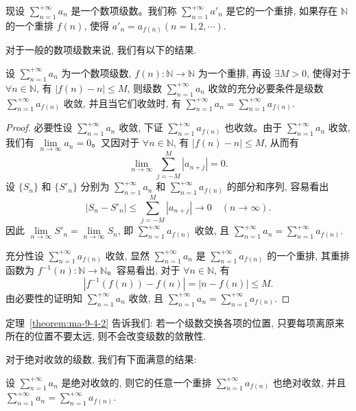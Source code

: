 现设 $\sum\limits_{n=1}^{+\infty}a_n$ 是一个数项级数。我们称 $\sum\limits_{n=1}^{+\infty}a'_n$ 是它的一个重排, 如果存在 $\mathbb{N}$ 的一个重排 $f(n)$, 使得 $a'_n=a_{f(n)}(n=1,2,\cdots)$.

对于一般的数项级数来说, 我们有以下的结果.

\begin{theorem}\label{theorem:ma-9-4-2}
设 $\sum\limits_{n=1}^{+\infty}a_n$ 为一个数项级数, $f(n):\mathbb{N}\to\mathbb{N}$ 为一个重排, 再设 $\exists M>0$, 使得对于 $\forall n\in\mathbb{N}$, 有 $|f(n)-n|\leq M$, 则级数 $\sum\limits_{n=1}^{+\infty}a_n$ 收敛的充分必要条件是级数 $\sum\limits_{n=1}^{+\infty}a_{f(n)}$ 收敛, 并且当它们收敛时, 有 $\sum\limits_{n=1}^{+\infty}a_n=\sum\limits_{n=1}^{+\infty}a_{f(n)}$.
\end{theorem}


\begin{proof}
必要性\quad 设 $\sum\limits_{n=1}^{+\infty}a_n$ 收敛, 下证 $\sum\limits_{n=1}^{+\infty}a_{f(n)}$ 也收敛。由于 $\sum\limits_{n=1}^{+\infty}a_n$ 收敛, 我们有 $\lim\limits_{n\to\infty}a_n=0$。又因对于 $\forall n\in\mathbb{N}$, 有 $|f(n)-n|\leq M$, 从而有
\[
  \lim_{n\to\infty}\sum_{j=-M}^{M}|a_{n+j}|=0.
\]
设 $\{S_n\}$ 和 $\{S'_n\}$ 分别为 $\sum\limits_{n=1}^{+\infty}a_n$ 和 $\sum\limits_{n=1}^{+\infty}a_{f(n)}$ 的部分和序列, 容易看出
\[
  |S_n-S'_n|\leq\sum_{j=-M}^{M}|a_{n+j}|\to0\quad(n\to\infty).
\]
因此 $\lim\limits_{n\to\infty}S'_n=\lim\limits_{n\to\infty}S_n$, 即 $\sum\limits_{n=1}^{+\infty}a_{f(n)}$ 收敛, 且 $\sum\limits_{n=1}^{+\infty}a_n=\sum\limits_{n=1}^{+\infty}a_{f(n)}$.

充分性\quad 设 $\sum\limits_{n=1}^{+\infty}a_{f(n)}$ 收敛, 显然 $\sum\limits_{n=1}^{+\infty}a_n$ 是 $\sum\limits_{n=1}^{+\infty}a_{f(n)}$ 的一个重排, 其重排函数为 $f^{-1}(n):\mathbb{N}\to\mathbb{N}$。容易看出, 对于 $\forall n\in\mathbb{N}$, 有
\[
  |f^{-1}(f(n))-f(n)|=|n-f(n)|\leq M.
\]
由必要性的证明知 $\sum\limits_{n=1}^{+\infty}a_n$ 收敛, 且 $\sum\limits_{n=1}^{+\infty}a_n=\sum\limits_{n=1}^{+\infty}a_{f(n)}$.
\end{proof}


\begin{remark}\label{remark:ma-9-source-73}
定理~\ref{theorem:ma-9-4-2} 告诉我们: 若一个级数交换各项的位置, 只要每项离原来所在的位置不要太远, 则不会改变级数的敛散性.
\end{remark}

对于绝对收敛的级数, 我们有下面满意的结果:

\begin{theorem}\label{theorem:ma-9-4-3}
设 $\sum\limits_{n=1}^{+\infty}a_n$ 是绝对收敛的, 则它的任意一个重排 $\sum\limits_{n=1}^{+\infty}a_{f(n)}$ 也绝对收敛, 并且 $\sum\limits_{n=1}^{+\infty}a_n=\sum\limits_{n=1}^{+\infty}a_{f(n)}$.
\end{theorem}


